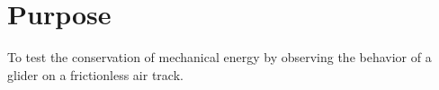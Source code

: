 
\section{Purpose}
\vspace{-0.5cm}
\singlespacing
To test the conservation of mechanical energy by observing the behavior of a glider on a frictionless air track.
